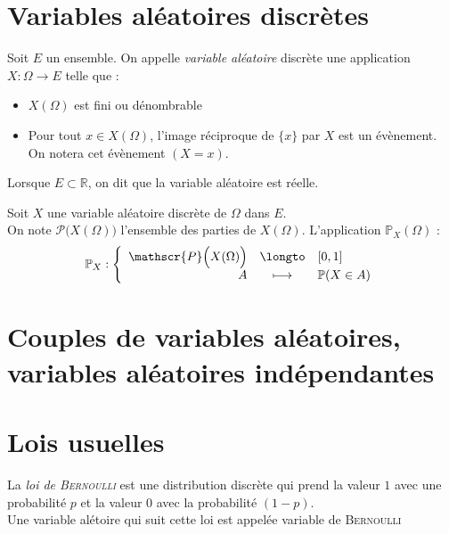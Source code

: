 \documentclass[11pt,a4paper,fleqn,pdftex]{report}
\begin{document}
\section{Variables aléatoires discrètes} %
\label{sec:variables_aleatoires_discretes}
\begin{dfn}
     Soit $E$ un ensemble. On appelle \emph{variable aléatoire} discrète une application $X : \Omega \to E$ telle que :
     \begin{itemize}
         \item $X(\Omega )$ est fini ou dénombrable
         \item Pour tout $x \in X(\Omega )$, l'image réciproque de $\lbrace x \rbrace$ par $X$ est un évènement. On notera cet évènement $(X= x)$.
     \end{itemize}
\end{dfn}
Lorsque $E\subset \mathbb{R}$, on dit que la variable aléatoire est réelle.
\begin{dfn}
     Soit $X$ une variable aléatoire discrète de $\Omega$ dans $E$.\\
     On note $\mathscr{P} \Big( X(\Omega ) \Big)$ l'ensemble des parties de $X(\Omega )$.
     L'application $\mathbb{P}_X (\Omega )$ : 
     \begin{equation}
      \mathbb{P}_X : \left\lbrace
      \begin{array}{r c l}
           \mathscr{P} \Big( X(\Omega ) \Big) &\longto & [0,1] \\
           A & \longmapsto & \mathbb{P} (X\in A)
      \end{array} \right.
      \end{equation}
\end{dfn}
\section[Couples de variables aléatoires]{Couples de variables aléatoires, variables aléatoires indépendantes} %
\label{sec:couples_de_variables_aleatoires}
\section{Lois usuelles} %
\label{sec:lois_usuelles}
\begin{dfn}
     La \emph{loi de \textsc{Bernoulli}} est une distribution discrète qui prend la valeur $1$ avec une probabilité $p$ et la valeur $0$ avec la probabilité $(1-p)$. \\
     Une variable alétoire qui suit cette loi est appelée variable de \textsc{Bernoulli}
\end{dfn}
\end{document}
